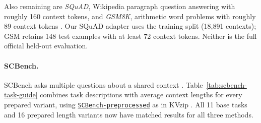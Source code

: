 Also remaining are \emph{SQuAD}, Wikipedia paragraph question answering
with roughly 160 context tokens, and \emph{GSM8K}, arithmetic word
problems with roughly 89 context tokens
\citep{rajpurkar2016squad,cobbe2021gsm8k}. Our SQuAD adapter uses the
training split (18,891 contexts); GSM retains 148 test examples with at
least 72 context tokens. Neither is the full official held-out evaluation.

\clearpage
\paragraph{SCBench.}
SCBench asks multiple questions about a shared context \citep{li2025scbench}.
Table~\ref{tab:scbench-task-guide} combines task descriptions with average
context lengths for every prepared variant, using
\href{https://huggingface.co/datasets/Jang-Hyun/SCBench-preprocessed}{\texttt{SCBench-preprocessed}}
as in KVzip \citep{kim2025kvzip}.
All 11 base tasks and 16 prepared length variants now have matched results
for all three methods.

